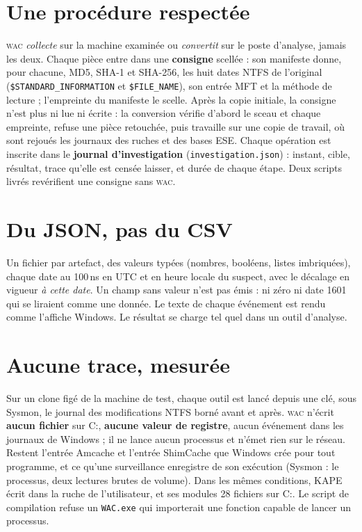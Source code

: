 \documentclass[10pt,a4paper,twocolumn]{article}
\newcommand{\wac}{\textsc{wac}}
\newcommand{\fichier}[1]{\texttt{#1}}
\begin{document}
\section{Une procédure respectée}
\wac{} \emph{collecte} sur la machine examinée ou \emph{convertit} sur le poste
d'analyse, jamais les deux. Chaque pièce entre dans une \textbf{consigne}
scellée : son manifeste donne, pour chacune, MD5, SHA-1 et SHA-256, les huit
dates NTFS de l'original (\fichier{\$STANDARD\_INFORMATION} et
\fichier{\$FILE\_NAME}), son entrée MFT et la méthode de lecture ; l'empreinte
du manifeste le scelle. Après la copie initiale, la consigne n'est plus ni lue
ni écrite : la conversion vérifie d'abord le sceau et chaque empreinte, refuse
une pièce retouchée, puis travaille sur une copie de travail, où sont rejoués
les journaux des ruches et des bases ESE. Chaque opération est inscrite dans
le \textbf{journal d'investigation} (\fichier{investigation.json}) : instant,
cible, résultat, trace qu'elle est censée laisser, et durée de chaque étape.
Deux scripts livrés revérifient une consigne sans \wac{}.

\section{Du JSON, pas du CSV}
Un fichier par artefact, des valeurs typées (nombres, booléens, listes
imbriquées), chaque date au 100\,ns en UTC et en heure locale du suspect, avec
le décalage en vigueur \emph{à cette date}. Un champ sans valeur n'est pas
émis : ni zéro ni date 1601 qui se liraient comme une donnée. Le texte de
chaque événement est rendu comme l'affiche Windows. Le résultat se charge tel
quel dans un outil d'analyse.

\section{Aucune trace, mesurée}
Sur un clone figé de la machine de test, chaque outil est lancé depuis une clé,
sous Sysmon, le journal des modifications NTFS borné avant et après. \wac{}
n'écrit \textbf{aucun fichier} sur C:, \textbf{aucune valeur de registre},
aucun événement dans les journaux de Windows ; il ne lance aucun processus et
n'émet rien sur le réseau. Restent l'entrée Amcache et l'entrée ShimCache que
Windows crée pour tout programme, et ce qu'une surveillance enregistre de son
exécution (Sysmon : le processus, deux lectures brutes de volume). Dans les
mêmes conditions, KAPE écrit dans la ruche de l'utilisateur, et ses modules
28 fichiers sur C:. Le script de compilation refuse un \fichier{WAC.exe} qui
importerait une fonction capable de lancer un processus.
\end{document}
